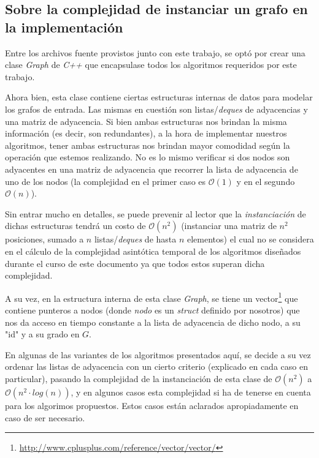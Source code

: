 \subsection*{Sobre la complejidad de instanciar un grafo en la implementaci\'on\label{grafo:estructuras}}
\par Entre los archivos fuente provistos junto con este trabajo, se opt\'o por
    crear una clase \emph{Graph} de \emph{C++} que encapsulase todos los algoritmos
    requeridos por este trabajo.

\par Ahora bien, esta clase contiene ciertas estructuras internas de datos
    para modelar los grafos de entrada. Las mismas en cuesti\'on son listas/\emph{deques}
    de adyacencias y una matriz de adyacencia. Si bien ambas estructuras nos
    brindan la misma informaci\'on (es decir, son redundantes), a la hora
    de implementar nuestros algoritmos, tener ambas estructuras nos brindan
    mayor comodidad seg\'un la operaci\'on que estemos realizando. No es lo
    mismo verificar si dos nodos son adyacentes en una matriz de adyacencia que
    recorrer la lista de adyacencia de uno de los nodos (la complejidad en
    el primer caso es $\mathcal O(1)$ y en el segundo $\mathcal O(n)$).

\par Sin entrar mucho en detalles, se puede prevenir al lector que la \emph{%
    instanciaci\'on} de dichas estructuras tendr\'a un costo de $\mathcal O%
    (n^2)$ (instanciar una matriz de $n^2$ posiciones, sumado a $n$ listas/\emph{deques} de
    hasta $n$ elementos) el cual no se considera en el c\'alculo de la complejidad
    asint\'otica temporal de los algoritmos dise\~nados durante el curso de este
    documento ya que todos estos superan dicha complejidad.

\par A su vez, en la estructura interna de esta clase \emph{Graph}, se tiene
    un vector\footnote{\url{http://www.cplusplus.com/reference/vector/vector/}}
    que contiene punteros a nodos (donde \emph{nodo} es un \emph{struct} definido
    por nosotros) que nos da acceso en tiempo constante a la lista de adyacencia
    de dicho nodo, a su "id" y a su grado en $G$.

\par En algunas de las variantes de los algoritmos presentados aqu\'i, se decide
    a su vez ordenar las listas de adyacencia con un cierto criterio (explicado
    en cada caso en particular), pasando la complejidad de la instanciaci\'on
    de esta clase de $\mathcal O(n^2)$ a $\mathcal O(n^2 \cdot log(n))$, y
    en algunos casos esta complejidad si ha de tenerse en cuenta para los algorimos
    propuestos. Estos casos est\'an aclarados apropiadamente en caso de ser
    necesario.

